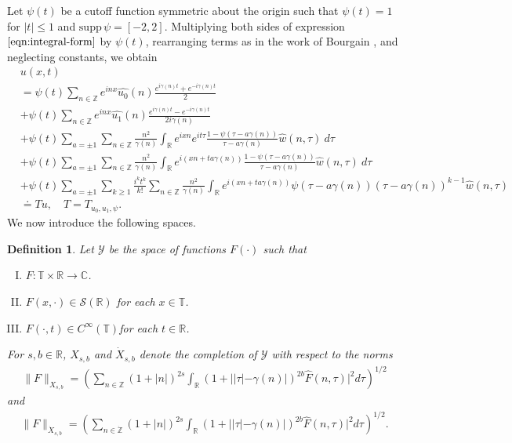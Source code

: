 \documentclass[12pt,reqno]{amsart}
\numberwithin{equation}{section}  %
\renewcommand{\cref}{\Cref}
\newcommand{\rr}{\mathbb{R}}
\newcommand{\zz}{\mathbb{Z}}
\newcommand{\cc}{\mathbb{C}}
\newcommand{\ci}{\mathbb{T}}
\newcommand{\zzdot}{\dot{\zz}}
\newcommand{\wh}{\widehat}
\newtheorem{definition}[theorem]{Definition}
\begin{document}
%
%
Let $\psi(t)$ be a cutoff function symmetric about the 
origin such that $\psi(t) = 1$ for $|t| \le 1$ and $\text{supp} \, \psi 
= [-2, 2 ]$.
Multiplying both sides of expression
$\cref{eqn:integral-form}$ by $\psi(t)$, rearranging terms as in the work of Bourgain \cite{Bourgain-Fourier-transfo}, and neglecting constants, we obtain
%
%
%
%
%
\begin{align}
  & u(x,t)
  \label{main1-rel-term-0}
  \\
  \label{main1-rel-term-1}
  & = \psi(t) \sum_{n \in \zz} e^{inx} \wh{u_{0}}(n) \frac{e^{i\gamma(n)t} + e^{-i\gamma(n)t}}{2} 
  \\
  \label{main1-rel-term-2}
  & + \psi(t) \sum_{n \in \zz} e^{inx}
  \wh{u_{1}}(n)\frac{e^{i\gamma(n)t} - e^{-i\gamma(n)t}}{2 i \gamma(n)} 
  \\
  \label{main1-rel-term-3}
  & +  \psi(t)\sum_{a = \pm 1} \sum_{n\in \zz} \frac{n^{2}}{\gamma(n)}\int_\rr e^{ixn}  
  e^{it \tau} \frac{1 - \psi(\tau -  a\gamma(n)) 
}{\tau -  a\gamma(n)} \wh{w}(n, \tau) \ d \tau
  \\
  \label{main1-rel-term-4}
  & + \psi(t) \sum_{a = \pm 1} \sum_{n\in \zz} \frac{n^{2}}{\gamma(n)}\int_\rr e^{i(xn + 
  t a\gamma(n))}
  \frac{1- \psi(\tau -  a\gamma(n))}{\tau -  a\gamma(n)} \wh{w}(n, \tau) \ d \tau
  \\
  \label{main1-rel-term-4.5}
  & +  \psi(t) \sum_{a = \pm 1}  \sum_{k \ge 1} \frac{i^k t^k}{k!}
  \sum_{n \in \zz} \frac{n^{2}}{\gamma(n)}\int_\rr e^{i(xn + t a\gamma(n) )}
  \psi(\tau -  a\gamma(n)) (\tau -  a\gamma(n))^{k-1} \wh{w}(n, \tau)
  \\
  \label{main1-rel-term-5}
  & \doteq Tu, \quad T=T_{u_0, u_1, \psi}.
\end{align}
%
%
%
%
%
%
%
%
%
%
%
%
We now introduce the following spaces. 
%
%
\begin{definition}
  Let $\mathcal{Y}$ be the space of functions $F(\cdot)$ such that
  \begin{enumerate}[(I)]
   \item{$F: \ci \times \rr \to \cc$}.
   \item{$F(x, \cdot) \in \mathcal{S}(\rr)$ for each $x \in \ci$}.
   \item{$F(\cdot, t) \in C^{\infty}(\ci)$for each $t \in \rr$}.
  \end{enumerate}
  For $s, b \in \rr$, $X_{s,b}$ and $\dot{X}_{s,b}$ denote the completion of $\mathcal{Y}$ with
  respect to the norms
  \begin{equation}
  \begin{split}
    \|F\|_{X_{s,b}} = \left( \sum_{n \in \zz} (1 + |n|)^{2s} \int_{\rr}
    (1 + ||\tau| - \gamma(n) |)^{2b} \wh{F}(n, \tau)|^{2} d \tau\right)^{1/2}
  \end{split}
  \label{eqn:bous-norm}
  \end{equation}
  and 
  \begin{equation*}
  \begin{split}
    \|F\|_{\dot{X}_{s,b}} = \left( \sum_{n \in \zzdot} (1 + |n|)^{2s} \int_{\rr}
    (1 + ||\tau| - \gamma(n) |)^{2b} \wh{F}(n, \tau)|^{2} d \tau\right)^{1/2}.
  \end{split}
  \end{equation*}
\end{definition}
\end{document}
